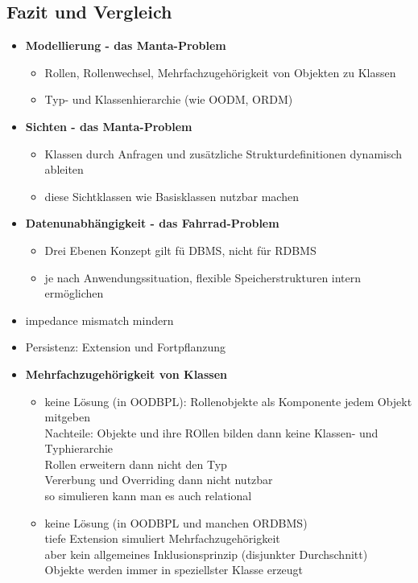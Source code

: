 \subsection{Fazit und Vergleich}
\begin{itemize}
	\item \textbf{Modellierung - das Manta-Problem}
	\begin{itemize}
		\item Rollen, Rollenwechsel, Mehrfachzugehörigkeit von Objekten zu Klassen
		\item Typ- und Klassenhierarchie (wie OODM, ORDM)
	\end{itemize}
	
	\item \textbf{Sichten - das Manta-Problem}
	\begin{itemize}
		\item Klassen durch Anfragen und zusätzliche Strukturdefinitionen dynamisch ableiten
		\item diese Sichtklassen wie Basisklassen nutzbar machen
	\end{itemize}
	
	\item \textbf{Datenunabhängigkeit - das Fahrrad-Problem}
	\begin{itemize}
		\item Drei Ebenen Konzept gilt fü DBMS, nicht für RDBMS
		\item je nach Anwendungssituation, flexible Speicherstrukturen intern ermöglichen
	\end{itemize}
	\item impedance mismatch mindern
	\item Persistenz: Extension und Fortpflanzung
	\item \textbf{Mehrfachzugehörigkeit von Klassen}
	\begin{itemize}
		\item keine Lösung (in OODBPL): Rollenobjekte als Komponente jedem Objekt mitgeben\\
		Nachteile: Objekte und ihre ROllen bilden dann keine Klassen- und Typhierarchie\\
		Rollen erweitern dann nicht den Typ\\
		Vererbung und Overriding dann nicht nutzbar\\
		so simulieren kann man es auch relational
		
		\item keine Lösung (in OODBPL und manchen ORDBMS)\\
		tiefe Extension simuliert Mehrfachzugehörigkeit\\
		aber kein allgemeines Inklusionsprinzip (disjunkter Durchschnitt)\\
		Objekte werden immer in speziellster Klasse erzeugt
	\end{itemize}
	

\end{itemize}
